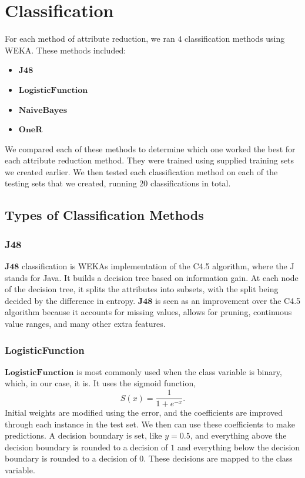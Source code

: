 \documentclass[12pt]{article}
\begin{document}
\newpage
\section{Classification}
For each method of attribute reduction, we ran $4$ classification methods using WEKA. These methods included: 
\begin{itemize}
    \item $\textbf{J48}$
    \item $\textbf{LogisticFunction}$
    \item $\textbf{NaiveBayes}$
    \item $\textbf{OneR}$
\end{itemize}
We compared each of these methods to determine which one worked the best for each attribute reduction method. They were trained using supplied training sets we created earlier. We then tested each classification method on each of the testing sets that we created, running $20$ classifications in total.

\subsection{Types of Classification Methods}
\subsubsection{J48}
$\textbf{J48}$ classification is WEKA\textquotesingle s implementation of the C4.5 algorithm, where the J stands for Java. It builds a decision tree based on information gain. At each node of the decision tree, it splits the attributes into subsets, with the split being decided by the difference in entropy. $\textbf{J48}$ is seen as an improvement over the C4.5 algorithm because it accounts for missing values, allows for pruning, continuous value ranges, and many other extra features. 

\subsubsection{LogisticFunction}
$\textbf{LogisticFunction}$ is most commonly used when the class variable is binary, which, in our case, it is. It uses the sigmoid function, $$S(x) = \frac{1}{1 + e^{-x}}.$$ Initial weights are modified using the error, and the coefficients are improved through each instance in the test set. We then can use these coefficients to make predictions. A decision boundary is set, like $ y = 0.5$, and everything above the decision boundary is rounded to a decision of $1$ and everything below the decision boundary is rounded to a decision of $0$. These decisions are mapped to the class variable. 
\end{document}
